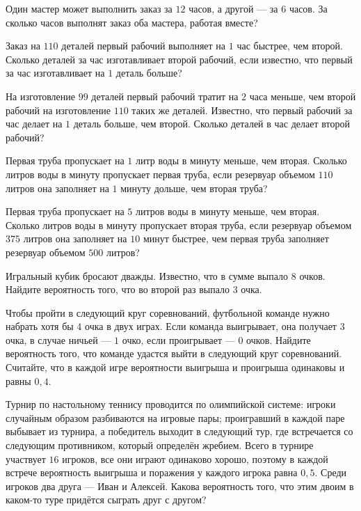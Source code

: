 \begin{class}[number=9]
\begin{listofex}
		\item Один мастер может выполнить заказ за \( 12 \) часов, а другой --- за \( 6 \) часов. За сколько часов выполнят заказ оба мастера, работая вместе?
		\item Заказ на \( 110 \) деталей первый рабочий выполняет на \( 1 \) час быстрее, чем второй. Сколько деталей за час изготавливает второй рабочий, если известно, что первый за час изготавливает на \( 1 \) деталь больше?
		\item На изготовление \( 99 \) деталей первый рабочий тратит на \( 2 \) часа меньше, чем второй рабочий на изготовление \( 110 \) таких же деталей. Известно, что первый рабочий за час делает на \( 1 \) деталь больше, чем второй. Сколько деталей в час делает второй рабочий?
		\item Первая труба пропускает на \( 1 \) литр воды в минуту меньше, чем вторая. Сколько литров воды в минуту пропускает первая труба, если резервуар объемом \( 110 \) литров она заполняет на \( 1 \) минуту дольше, чем вторая труба?
		\item Первая труба пропускает на \( 5 \) литров воды в минуту меньше, чем вторая. Сколько литров воды в минуту пропускает вторая труба, если резервуар объемом \( 375 \) литров она заполняет на \( 10 \) минут быстрее, чем первая труба заполняет резервуар объемом \( 500 \) литров?
		\item Игральный кубик бросают дважды. Известно, что в сумме выпало \(8\) очков. Найдите вероятность того, что во второй раз выпало \(3\) очка.
		\item Чтобы пройти в следующий круг соревнований, футбольной команде нужно набрать хотя бы \(4\) очка в двух играх. Если команда выигрывает, она получает \(3\) очка, в случае ничьей --- \(1\) очко, если проигрывает --- \(0\) очков. Найдите вероятность того, что команде удастся выйти в следующий круг соревнований. Считайте, что в каждой игре вероятности выигрыша и проигрыша одинаковы и равны \(0,4\).
		\item Турнир по настольному теннису проводится по олимпийской системе: игроки случайным образом разбиваются на игровые пары; проигравший в каждой паре выбывает из турнира, а победитель выходит в следующий тур, где встречается со следующим противником, который определён жребием. Всего в турнире участвует \(16\) игроков, все они играют одинаково хорошо, поэтому в каждой встрече вероятность выигрыша и поражения у каждого игрока равна \(0,5\). Среди игроков два друга --- Иван и Алексей. Какова вероятность того, что этим двоим в каком-то туре придётся сыграть друг с другом?
		

\end{listofex}
\end{class}
